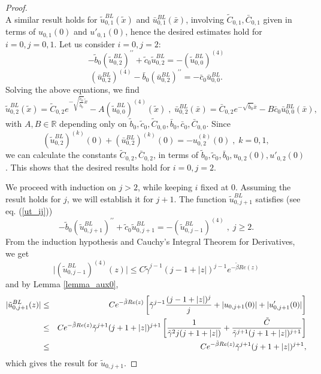 \documentclass[10pt,a4paper]{amsart}
\begin{document}
\begin{proof}
\[\]
A similar result holds for $\tilde{u}^{BL}_{0,1}(\tilde{x})$ and $\bar{u}^{BL}_{0,1}(\bar{x})$, involving 
$\tilde{C}_{0,1}, \bar{C}_{0,1}$ given in terms of $u_{0,1}(0)$ and $u'_{0,1}(0)$, hence the desired estimates 
hold for $i=0,j=0,1$. Let us consider $i=0,j=2$: 
%
\[
-\tilde{b}_0 \left(\tilde{u}^{BL}_{0,2}\right)^{\prime \prime} + \tilde{c}_0 \tilde{u}^{BL}_{0,2} = - \left(\tilde{u}^{BL}_{0,0}\right)^{(4)}
\]
%
\[
\left( \bar{u}^{BL}_{0,2}\right)^{(4)} - \bar{b}_0 \left(\bar{u}^{BL}_{0,2} \right)^{\prime \prime}= - \bar{c}_0 \bar{u}^{BL}_{0,0}.
\]
Solving the above equations, we find
%
\[
\tilde{u}^{BL}_{0,2}(\tilde{x}) = \tilde{C}_{0,2} e^{-\sqrt{\frac{\tilde{c}_0}{\tilde{b}_0}} \tilde{x}} - A \left(\tilde{u}^{BL}_{0,0}\right)^{(4)}(\tilde{x})\; , \;
\bar{u}^{BL}_{0,2}(\bar{x}) = \bar{C}_{0,2} e^{-\sqrt{\bar{b}_0} \bar{x}} - B \bar{c}_0 \bar{u}^{BL}_{0,0}(\bar{x}),
\]
with $A, B \in \mathbb{R}$ depending only on $\tilde{b}_0, \tilde{c}_0, \tilde{C}_{0,0}, \bar{b}_0, \bar{c}_0, \bar{C}_{0,0}$. Since 
%
\[
\left(\tilde{u}^{BL}_{0,2}\right)^{(k)}(0) + \left(\bar{u}^{BL}_{0,2}\right)^{(k)}(0) = - u^{(k)}_{0,2}(0) \; , \; k=0,1,
\]
%
we can calculate the constants $\tilde{C}_{0,2}, \bar{C}_{0,2}$, in terms of $\tilde{b}_0, \tilde{c}_0, \bar{b}_0, u_{0,2}(0), u'_{0,2}(0)$. This shows that the desired results hold for $i=0,j=2$.

We proceed with 
induction on $j>2$, while keeping $i$ fixed at 0. Assuming the result holds for $j$, we will establish it
for $j+1$. The function $\tilde{u}^{BL}_{0,j+1}$ satisfies (see eq. (\ref{ut_ij}))
%
\[
-\tilde{b}_{0}\left(\tilde{u}^{BL}_{0,j+1}\right)^{\prime \prime }+\tilde{c}_{0}\tilde{u}^{BL}_{0,j+1}=-%
\left(\tilde{u}^{BL}_{0,j-1}\right)^{(4)} \; , \; j\geq 2.
\]
From the induction hypothesis and Cauchy's Integral Theorem for Derivatives, we get
%
\[
\vert \left(\tilde{u}^{BL}_{0,j-1}\right)^{(4)}(z) \vert \leq C \tilde{\gamma}^{j-1} (j-1+|z|)^{j-1} e^{-\tilde{\beta} Re(z)}
\]
and by Lemma \ref{lemma_aux0},
%
\begin{eqnarray*}
\vert \tilde{u}^{BL}_{0,j+1} (z) \vert &\leq& C e^{-\tilde{\beta} Re(z)} \left[ \tilde{\gamma}^{j-1} \frac{(j-1+|z|)^{j}}{j} +
|u_{0,j+1}(0)| + |u'_{0,j+1}(0)| \right]  \notag \\
&\leq& C e^{-\tilde{\beta} Re(z)} \tilde{\gamma}^{j+1} (j+1+|z|)^{j+1}\left[ \frac{1}{\tilde{\gamma}^2 j (j+1+|z|)} + \frac{\tilde{C}}{\tilde{\gamma}^{j+1} (j+1+|z|)^{j+1}} \right] \\
&\leq& C e^{-\tilde{\beta} Re(z)} \tilde{\gamma}^{j+1} (j+1+|z|)^{j+1},
\end{eqnarray*}
%
which gives the result for $\tilde{u}_{0,j+1}$.


\end{proof}
\end{document}
